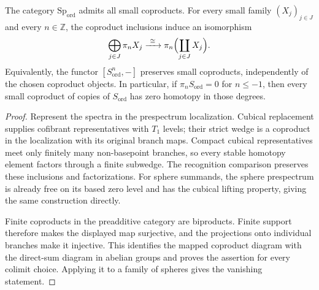 \begin{theorem}
\label{sem:AdamsSynthetic:sphere-coproducts}
\label{sem:AdamsSynthetic:homotopy-small-coproducts}
The category $\mathrm{Sp}_{\mathrm{ord}}$ admits all small coproducts.
For every small family $(X_j)_{j\in J}$ and every $n\in\mathbb Z$,
the coproduct inclusions induce an isomorphism
\[
 \bigoplus_{j\in J}\pi_nX_j\xrightarrow{\ \cong\ }
       \pi_n\Bigl(\coprod_{j\in J}X_j\Bigr).
\]
Equivalently, the functor
$[S_{\mathrm{ord}}^n,-]$ preserves small coproducts, independently of
the chosen coproduct objects. In particular, if
$\pi_nS_{\mathrm{ord}}=0$ for $n\le-1$, then every small coproduct
of copies of $S_{\mathrm{ord}}$ has zero homotopy in those degrees.
\end{theorem}
\begin{proof}
Represent the spectra in the prespectrum localization. Cubical
replacement supplies cofibrant representatives with $T_1$ levels;
their strict wedge is a coproduct in the localization with its original
branch maps. Compact cubical representatives meet only finitely many
non-basepoint branches, so every stable homotopy element factors through
a finite subwedge. The recognition comparison preserves these
inclusions and factorizations. For sphere summands, the sphere
prespectrum is already free on its based zero level and has the cubical
lifting property, giving the same construction directly.

Finite coproducts in the preadditive category are biproducts.
Finite support therefore makes the displayed map surjective, and the
projections onto individual branches make it injective. This identifies
the mapped coproduct diagram with the direct-sum diagram in abelian
groups and proves the assertion for every colimit choice. Applying it
to a family of spheres gives the vanishing statement.
\end{proof}

